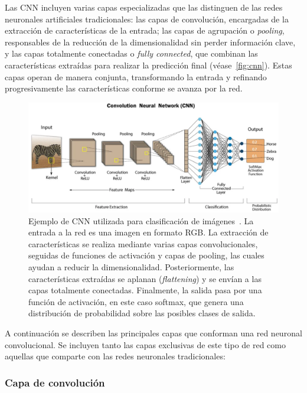 Las CNN incluyen varias capas especializadas que las distinguen de las redes neuronales artificiales tradicionales: las capas de convolución, encargadas de la extracción de características de la entrada; las capas de agrupación o \emph{pooling}, responsables de la reducción de la dimensionalidad sin perder información clave, y las capas totalmente conectadas o \emph{fully connected}, que combinan las características extraídas para realizar la predicción final (véase~\autoref{fig:cnn}). Estas capas operan de manera conjunta, transformando la entrada y refinando progresivamente las características conforme se avanza por la red.\newline

\begin{figure}[h]
    \centering
    \includegraphics[width=0.8\linewidth]{img/cnn.png}
    \caption[Ejemplo de CNN utilizada para clasificación de imágenes~\cite{CNNSwapna}.]{Ejemplo de CNN utilizada para clasificación de imágenes~\cite{CNNSwapna}. La entrada a la red es una imagen en formato RGB. La extracción de características se realiza mediante varias capas convolucionales, seguidas de funciones de activación y capas de pooling, las cuales ayudan a reducir la dimensionalidad. Posteriormente, las características extraídas se aplanan (\textit{flattening}) y se envían a las capas totalmente conectadas. Finalmente, la salida pasa por una función de activación, en este caso softmax, que genera una distribución de probabilidad sobre las posibles clases de salida.}\label{fig:cnn}
\end{figure}

A continuación se describen las principales capas que conforman una red neuronal convolucional. Se incluyen tanto las capas exclusivas de este tipo de red como aquellas que comparte con las redes neuronales tradicionales:


\subsubsection{Capa de convolución}


